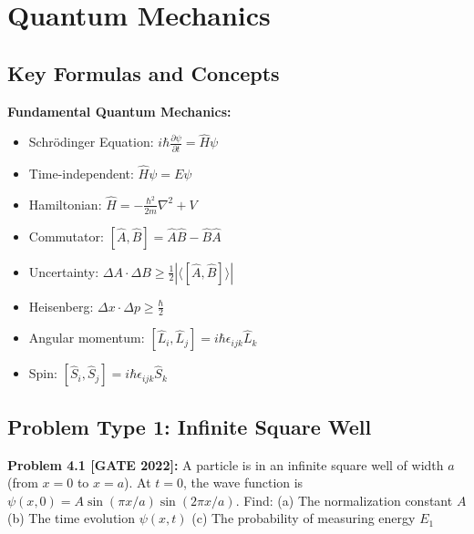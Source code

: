 \documentclass[12pt,a4paper]{article}
\begin{document}
\newpage


\section{Quantum Mechanics}

\subsection{Key Formulas and Concepts}

\begin{theorem}
\textbf{Fundamental Quantum Mechanics:}
\begin{itemize}
    \item Schrödinger Equation: $i\hbar\frac{\partial\psi}{\partial t} = \hat{H}\psi$
    \item Time-independent: $\hat{H}\psi = E\psi$
    \item Hamiltonian: $\hat{H} = -\frac{\hbar^2}{2m}\nabla^2 + V$
    \item Commutator: $[\hat{A}, \hat{B}] = \hat{A}\hat{B} - \hat{B}\hat{A}$
    \item Uncertainty: $\Delta A \cdot \Delta B \geq \frac{1}{2}|\langle[\hat{A},\hat{B}]\rangle|$
    \item Heisenberg: $\Delta x \cdot \Delta p \geq \frac{\hbar}{2}$
    \item Angular momentum: $[\hat{L}_i, \hat{L}_j] = i\hbar\epsilon_{ijk}\hat{L}_k$
    \item Spin: $[\hat{S}_i, \hat{S}_j] = i\hbar\epsilon_{ijk}\hat{S}_k$
\end{itemize}
\end{theorem}

\subsection{Problem Type 1: Infinite Square Well}

\textbf{Problem 4.1 [GATE 2022]:} A particle is in an infinite square well of width $a$ (from $x=0$ to $x=a$). At $t=0$, the wave function is $\psi(x,0) = A\sin(\pi x/a)\sin(2\pi x/a)$. Find:
(a) The normalization constant $A$
(b) The time evolution $\psi(x,t)$
(c) The probability of measuring energy $E_1$
\end{document}
